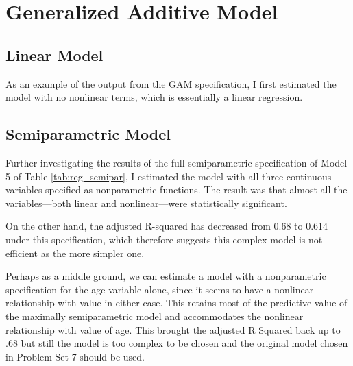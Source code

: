 





\pagebreak
\section{Generalized Additive Model}

\subsection{Linear Model}

As an example of the output from the GAM specification, 
I first estimated the model with no nonlinear terms, 
which is essentially a linear regression. 



\pagebreak
\subsection{Semiparametric Model}


Further investigating the results of the full semiparametric specification
of Model 5 of Table \ref{tab:reg_semipar},
I estimated the model with all three continuous variables specified as nonparametric functions. 
The result was that 
almost all the variables---both linear and nonlinear---were 
statistically significant. 




On the other hand, 
the adjusted R-squared has decreased
from 0.68 to 0.614 under this specification, 
which therefore suggests this complex model is not efficient as the more simpler one.


Perhaps as a middle ground, we can estimate a model with a 
nonparametric specification for the age variable alone, 
since it seems to have a nonlinear relationship with value in either case. 
This retains most of the predictive value of the maximally 
semiparametric model and accommodates the 
nonlinear relationship with value of age. This brought the adjusted R Squared back up to .68 but still the model is too complex to be chosen and the original model chosen in Problem Set 7 should be used.





%
